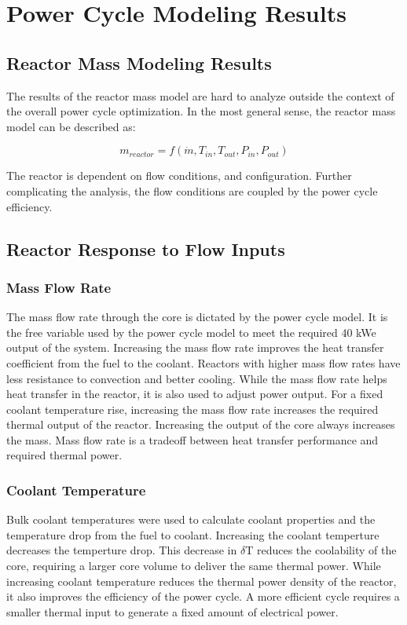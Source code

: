 \chapter{Power Cycle Modeling Results}\label{ch:power_cycle_results}

\section{Reactor Mass Modeling Results}
The results of the reactor mass model are hard to analyze outside the context of
the overall power cycle optimization. In the most general sense, the reactor
mass model can be described as:

\begin{equation}
    m_{reactor} = f(\dot{m}, T_{in}, T_{out}, P_{in}, P_{out})
\end{equation}

The reactor is dependent on flow conditions, and configuration. Further
complicating the analysis, the flow conditions are coupled by the power cycle
efficiency.

\section{Reactor Response to Flow Inputs}

\subsection{Mass Flow Rate}
The mass flow rate through the core is dictated by the power cycle model. It is
the free variable used by the power cycle model to meet the required 40 kWe
output of the system. Increasing the mass flow rate improves the heat transfer
coefficient from the fuel to the coolant. Reactors with higher mass flow rates
have less resistance to convection and better cooling. While the mass flow rate
helps heat transfer in the reactor, it is also used to adjust power output. For
a fixed coolant temperature rise, increasing the mass flow rate increases the
required thermal output of the reactor. Increasing the output of the core always
increases the mass. Mass flow rate is a tradeoff between heat transfer
performance and required thermal power.

\subsection{Coolant Temperature}
Bulk coolant temperatures were used to calculate coolant properties and the
temperature drop from the fuel to coolant. Increasing the coolant temperture
decreases the temperture drop. This decrease in $\delta$T reduces the
coolability of the core, requiring a larger core volume to deliver the same
thermal power. While increasing coolant temperature reduces the thermal power
density of the reactor, it also improves the efficiency of the power cycle. A
more efficient cycle requires a smaller thermal input to generate a fixed amount
of electrical power.

